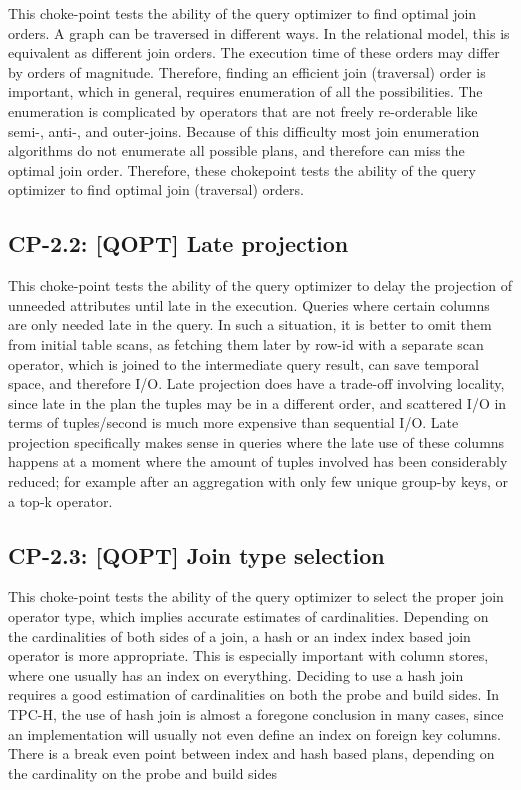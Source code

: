 This choke-point tests the ability of the query optimizer to find optimal join orders. A graph can be traversed in different ways. In the relational model, this is equivalent as different join orders.
The execution time of these orders may differ by orders of magnitude. Therefore, finding an efficient join (traversal) order is important, which in general, requires enumeration of all the possibilities.
The enumeration is complicated by operators that are not freely re-orderable like semi-, \mbox{anti-,} and outer-joins. Because of this difficulty most join enumeration algorithms do not enumerate all possible plans, and therefore can miss the optimal join order. Therefore, these chokepoint tests the ability of the query optimizer to find optimal join (traversal) orders.



\subsection*{CP-2.2: [QOPT] Late projection}
\label{choke_point_2.2}


This choke-point tests the ability of the query optimizer to delay the projection of unneeded attributes until late in the execution. Queries where certain columns are only needed late in the query.
In such a situation, it is better to omit them from initial table scans, as fetching them later by row-id with a separate scan operator, which is joined to the intermediate query result, can save temporal space, and therefore I/O.
Late projection does have a trade-off involving locality, since late in the plan the tuples may be in a different order, and scattered I/O in terms of tuples/second is much more expensive than sequential I/O.
Late projection specifically makes sense in queries where the late use of these columns happens at a moment where the amount of tuples involved has been considerably reduced;
for example after an aggregation with only few unique group-by keys, or a top-k operator.



\subsection*{CP-2.3: [QOPT] Join type selection}
\label{choke_point_2.3}


This choke-point tests the ability of the query optimizer to select the proper join operator type, which implies accurate estimates of cardinalities.
Depending on the cardinalities of both sides of a join, a hash or an index index based join operator is more appropriate.
This is especially important with column stores, where one usually has an index on everything. Deciding to use a hash join requires a good estimation of cardinalities on both the probe and build sides.
In TPC-H, the use of hash join is almost a foregone conclusion in many cases, since an implementation will usually not even define an index on foreign key columns.
There is a break even point between index and hash based plans, depending on the cardinality on the probe and build sides

